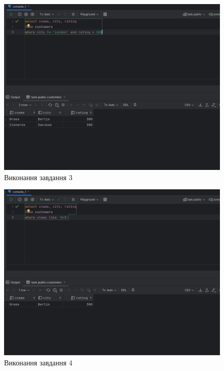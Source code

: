 \documentclass[14pt]{extreport}
\begin{document}
\begin{normalsize}
	\begin{figure}[H]
		\centering
		\includegraphics[scale=0.45]{3}
		\caption{Виконання завдання 3}
	\end{figure}
	
	\begin{figure}[H]
		\centering
		\includegraphics[scale=0.45]{4}
		\caption{Виконання завдання 4}
	\end{figure}
	

\end{normalsize}
\end{document}
